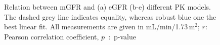 \begin{figure}[H]
	\centering
	 \\ \vspace{10pt}  
 	 \hfill {} \\ \vspace{10pt}   
	 \hfill {}

\caption[Relation between mGFR and different estimation method]{Relation between mGFR and (a) eGFR (b-e) different PK models. The dashed grey line indicates equality, whereas robust blue one the best linear fit. All measurements are given in mL/min/1.73\,m$^2$; $r$: Pearson correlation coefficient, $p$~:~p-value } 
\label{fig:regression}
\end{figure}
  
  

